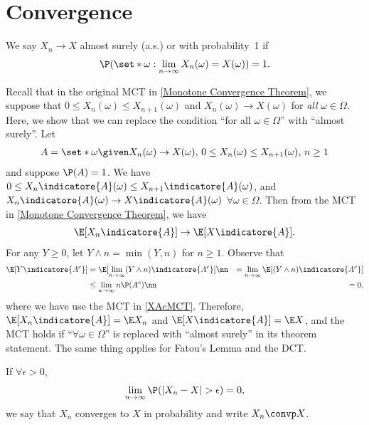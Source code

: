\documentclass[../aipt.tex]{subfiles}
\begin{document}


\section{Convergence}

\begin{Definition}
We say $X_n \to X$ almost surely (a.s.) or with probability~1 if 
\begin{align*}
\P (\set*{\omega: \lim_{n \to \infty} {X_n(\omega)=X(\omega)}})=1.
\end{align*}
\end{Definition}

Recall that in the original MCT in \cref{Monotone Convergence Theorem}, we suppose that $0 \leq X_n(\omega) \leq X_{n+1}(\omega)$ and $X_n(\omega) \to X(\omega)$ for \emph{all} $\omega\in\Omega$. Here, we show that we can replace the condition ``for all $\omega\in\Omega$'' with ``almost surely''. Let 
\begin{align*}
A=\set*{\omega \given X_n(\omega) \to X(\omega),\, 0\leq X_n(\omega )\leq X_{n+1}(\omega ),\, n \geq 1}
\end{align*}
and suppose $\P (A)=1$. We have $0\leq X_n \indicatore{A}(\omega)\leq X_{n+1} \indicatore{A}(\omega)$, and $X_{n} \indicatore{A}(\omega) \to X \indicatore{A}(\omega)$ $\forall \omega \in \Omega$. Then from the MCT in \cref{Monotone Convergence Theorem}, we have
\begin{align*}
\E[X_n \indicatore{A}] \to \E[X \indicatore{A}].
\end{align*}
For any $Y \geq 0$, let $Y \wedge n = \min(Y,n)$ for $n\geq 1$. Observe that
\begin{align}
\E[Y\indicatore{A^c}] 
&= \E[\lim_{n \to \infty} (Y \wedge n) \indicatore{A^c}]\nn
&= \lim_{n \to \infty} \E[(Y \wedge n)\indicatore{A^c}]\label{XAcMCT}\\
& \leq \lim_{n \to \infty} {n \P (A^c)}\nn
&= 0,\nonumber
\end{align}
where we have use the MCT in \cref{XAcMCT}. Therefore, $\E[X_n \indicatore{A}] = \E X_n$ and $\E[X \indicatore{A}] = \E X$, and the MCT holds if ``$\forall \omega\in\Omega$'' is replaced with ``almost surely'' in its theorem statement. The same thing applies for Fatou's Lemma and the DCT.

\begin{Definition}
If $\forall \epsilon >0$,  
\begin{align*}
\lim_ {n \to \infty} \P({|X_n - X| > \epsilon})=0, 
\end{align*}
we say that $X_n$ converges to $X$ in probability and write $X_n \convp X$.
\end{Definition}
\end{document}
